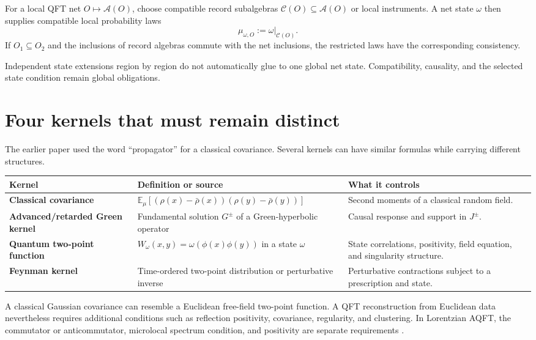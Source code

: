 \documentclass[11pt]{article}
\newcommand{\A}{\mathcal A}
\newcommand{\C}{\mathcal C}
\newcommand{\E}{\mathbb E}
\begin{document}
For a local QFT net \(O\mapsto\A(O)\), choose compatible record
subalgebras \(\C(O)\subseteq\A(O)\) or local instruments.  A net state
\(\omega\) then supplies compatible local probability laws
\[
 \mu_{\omega,O}:=\omega|_{\C(O)}.
\]
If \(O_1\subseteq O_2\) and the inclusions of record algebras commute with
the net inclusions, the restricted laws have the corresponding consistency.

Independent state extensions region by region do not automatically glue
to one global net state.  Compatibility, causality, and the selected state
condition remain global obligations.

\section{Four kernels that must remain distinct}

The earlier paper used the word ``propagator'' for a classical covariance.
Several kernels can have similar formulas while carrying different
structures.

\begin{center}
\small
\begin{tabularx}{\textwidth}{>{\raggedright\arraybackslash\bfseries}p{}>{\raggedright\arraybackslash}p{}>{\raggedright\arraybackslash}X}
\toprule
Kernel & Definition or source & What it controls \\
\midrule
Classical covariance &
\(\E_\mu[(\rho(x)-\bar\rho(x))(\rho(y)-\bar\rho(y))]\) &
Second moments of a classical random field. \\
Advanced/retarded Green kernel &
Fundamental solution \(G^\pm\) of a Green-hyperbolic operator &
Causal response and support in \(J^\pm\). \\
Quantum two-point function &
\(W_\omega(x,y)=\omega(\phi(x)\phi(y))\) in a state \(\omega\) &
State correlations, positivity, field equation, and singularity structure. \\
Feynman kernel &
Time-ordered two-point distribution or perturbative inverse &
Perturbative contractions subject to a prescription and state. \\
\bottomrule
\end{tabularx}
\end{center}

A classical Gaussian covariance can resemble a Euclidean free-field
two-point function.  A QFT reconstruction from Euclidean data nevertheless
requires additional conditions such as reflection positivity, covariance,
regularity, and clustering.  In Lorentzian AQFT, the commutator or
anticommutator, microlocal spectrum condition, and positivity are separate
requirements \cite{osterwalder_schrader1,osterwalder_schrader2,
radzikowski,bfv}.
\end{document}
